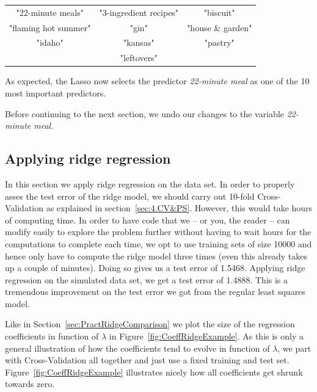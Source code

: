 \begin{center}
    \begin{tabular}{ccc}
    \vspace{3pt}
        "22-minute meals" & "3-ingredient recipes" & "biscuit"\\
        \vspace{3pt}
        "flaming hot summer" & "gin" & "house \& garden"\\
        \vspace{3pt}
        "idaho" & "kansas" & "pastry"\\
        & "leftovers" &
    \end{tabular}
\end{center}
As expected, the Lasso now selects the predictor \textit{22-minute meal} as one of the 10 most important predictors.

Before continuing to the next section, we undo our changes to the variable \textit{22-minute meal}.

\subsection{Applying ridge regression} \label{sec:ApplyingRidgeRegression}
In this section we apply ridge regression on the data set. In order to properly asses the test error of the ridge model, we should carry out 10-fold Cross-Validation as explained in section~\ref{sec:4.CV&PS}. However, this would take hours of computing time. In order to have code that we -- or you, the reader -- can modify easily to explore the problem further without having to wait hours for the computations to complete each time, we opt to use training sets of size \num{10 000} and hence only have to compute the ridge model three times (even this already takes up a couple of minutes). Doing so gives us a test error of \num{1.5468}. Applying ridge regression on the simulated data set, we get a test error of \num{1.4888}. This is a tremendous improvement on the test error we got from the regular least squares model.

Like in Section~\ref{sec:PractRidgeComparison} we plot the size of the regression coefficients in function of $\lambda$ in Figure~\ref{fig:CoeffRidgeExample}. As this is only a general illustration of how the coefficients tend to evolve in function of $\lambda$, we part with Cross-Validation all together and just use a fixed training and test set. Figure~\ref{fig:CoeffRidgeExample} illustrates nicely how all coefficients get shrunk towards zero.

